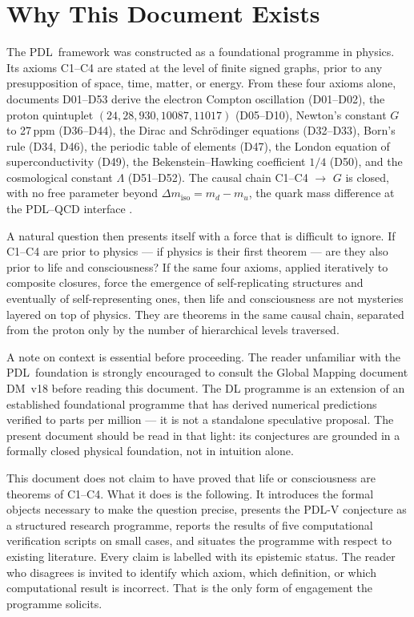 \documentclass[12pt,a4paper]{article}
\theoremstyle{plain}
\theoremstyle{definition}
\theoremstyle{remark}
\newcommand{\PDL}{\textsc{PDL}}
\begin{document}
\tableofcontents
\newpage

\section{Why This Document Exists}
\label{sec:motivation}

The \PDL\ framework was constructed as a foundational programme in physics. Its axioms
C1--C4 are stated at the level of finite signed graphs, prior to any presupposition of
space, time, matter, or energy. From these four axioms alone, documents D01--D53
derive the electron Compton oscillation (D01--D02), the proton quintuplet
$(24,28,930,10087,11017)$ (D05--D10), Newton's constant $G$ to 27\,ppm (D36--D44),
the Dirac and Schrödinger equations (D32--D33), Born's rule (D34, D46), the periodic
table of elements (D47), the London equation of superconductivity (D49), the
Bekenstein--Hawking coefficient $1/4$ (D50), and the cosmological constant $\Lambda$
(D51--D52). The causal chain C1--C4 $\to$ $G$ is closed, with no free parameter
beyond $\Delta m_{\mathrm{iso}} = m_d - m_u$, the quark mass difference at the
\PDL--QCD interface \cite{DM_v18}.

A natural question then presents itself with a force that is difficult to ignore. If
C1--C4 are prior to physics --- if physics is their first theorem --- are they also
prior to life and consciousness? If the same four axioms, applied iteratively to
composite closures, force the emergence of self-replicating structures and eventually
of self-representing ones, then life and consciousness are not mysteries layered on
top of physics. They are theorems in the same causal chain, separated from the proton
only by the number of hierarchical levels traversed.

A note on context is essential before proceeding. The reader unfamiliar with the
\PDL\ foundation is strongly encouraged to consult the Global Mapping document
DM~v18 \cite{DM_v18} before reading this document. The DL programme is an extension
of an established foundational programme that has derived numerical predictions
verified to parts per million --- it is not a standalone speculative proposal.
The present document should be read in that light: its conjectures are grounded in
a formally closed physical foundation, not in intuition alone.

This document does not claim to have proved that life or consciousness are theorems
of C1--C4. What it does is the following. It introduces the formal objects necessary
to make the question precise, presents the \PDL-V conjecture as a structured research
programme, reports the results of five computational verification scripts on small
cases, and situates the programme with respect to existing literature. Every claim is
labelled with its epistemic status. The reader who disagrees is invited to identify
which axiom, which definition, or which computational result is incorrect. That is the
only form of engagement the programme solicits.
\end{document}

